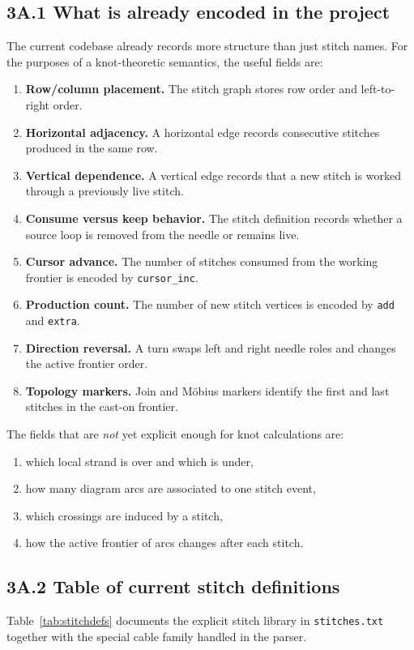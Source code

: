 \documentclass[11pt]{article}
\begin{document}
\subsection*{3A.1 What is already encoded in the project}
The current codebase already records more structure than just stitch names. For the purposes of a knot-theoretic semantics, the useful fields are:
\begin{enumerate}[leftmargin=1.5em,itemsep=0.2em]
    \item \textbf{Row/column placement.} The stitch graph stores row order and left-to-right order.
    \item \textbf{Horizontal adjacency.} A horizontal edge records consecutive stitches produced in the same row.
    \item \textbf{Vertical dependence.} A vertical edge records that a new stitch is worked through a previously live stitch.
    \item \textbf{Consume versus keep behavior.} The stitch definition records whether a source loop is removed from the needle or remains live.
    \item \textbf{Cursor advance.} The number of stitches consumed from the working frontier is encoded by \texttt{cursor\_inc}.
    \item \textbf{Production count.} The number of new stitch vertices is encoded by \texttt{add} and \texttt{extra}.
    \item \textbf{Direction reversal.} A turn swaps left and right needle roles and changes the active frontier order.
    \item \textbf{Topology markers.} Join and M\"obius markers identify the first and last stitches in the cast-on frontier.
\end{enumerate}

The fields that are \emph{not} yet explicit enough for knot calculations are:
\begin{enumerate}[leftmargin=1.5em,itemsep=0.2em]
    \item which local strand is over and which is under,
    \item how many diagram arcs are associated to one stitch event,
    \item which crossings are induced by a stitch,
    \item how the active frontier of arcs changes after each stitch.
\end{enumerate}

\subsection*{3A.2 Table of current stitch definitions}
Table~\ref{tab:stitchdefs} documents the explicit stitch library in \texttt{stitches.txt} together with the special cable family handled in the parser.
\end{document}
